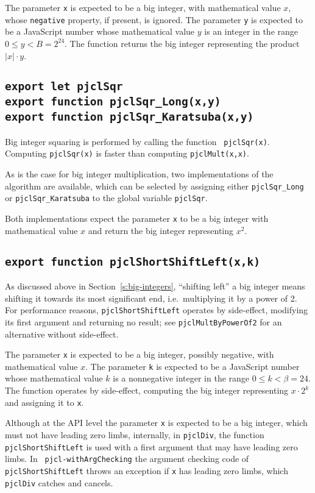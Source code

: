 \documentclass[12pt]{article}
\begin{document}
The parameter {\tt x} is expected to be a big integer, with
mathematical value $x$, whose {\tt negative} property, if present, is
ignored.  The parameter {\tt y} is expected to be a JavaScript number
whose mathematical value $y$ is an integer in the range $0 \leq y < B = 2^{24}$.  The
function returns the big integer representing the product $|x| \cdot y$.

\subsection{\tt export let pjclSqr\\export function pjclSqr\_Long(x,y)\\export function pjclSqr\_Karatsuba(x,y)}

Big integer squaring is performed by calling the function {\tt
  pjclSqr(x)}.  Computing {\tt pjclSqr(x)} is
faster than computing {\tt pjclMult(x,x)}.
  
As is the case for big integer multiplication, two
implementations of the algorithm are available, which can be selected
by assigning either {\tt pjclSqr\_Long} or {\tt pjclSqr\_Karatsuba} to
the global variable {\tt pjclSqr}.  

Both implementations expect the parameter {\tt x} to be a
big integer with mathematical value $x$ and return the big integer representing $x^2$.

\subsection{\tt export function pjclShortShiftLeft(x,k)}

As discussed above in Section~\ref{s:big-integers}, ``shifting left'' a big integer
means shifting it towards its most significant end, i.e.\ multiplying it by a power of 2.
For performance reasons, {\tt pjclShortShiftLeft} operates by side-effect, modifying its first argument and returning no result; see {\tt pjclMultByPowerOf2} for an alternative without side-effect.

The parameter {\tt x} is expected to be a big integer, possibly negative, with
mathematical value $x$.  The parameter {\tt k} is expected to be a JavaScript number
whose mathematical value $k$ is a nonnegative integer in the range $0
\leq k < \beta = 24$.  The function operates by side-effect, computing the big integer representing
$x\cdot2^k$ and assigning it to {\tt x}.

Although at the API level the parameter {\tt x} is expected to be a
big integer, which must not have leading zero limbs, internally, in
{\tt pjclDiv}, the function {\tt pjclShortShiftLeft} is used with a
first argument that may have leading zero limbs.  In {\tt
  pjcl-withArgChecking} the argument checking code of {\tt
  pjclShortShiftLeft} throws an exception if {\tt x} has leading zero
limbs, which {\tt pjclDiv} catches and cancels.
\end{document}
